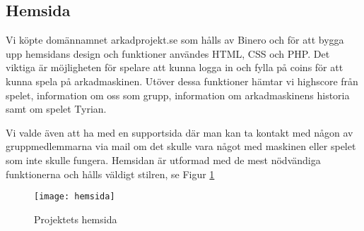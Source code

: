 \documentclass[12pt,fleqn,openany]{book} %
\begin{document}
\begin{table}[!h]
\centering\caption{Förklaring av databastabell}
\label{table_databas}
\end{table}

\subsection{Hemsida}

Vi köpte domännamnet arkadprojekt.se som hålls av Binero och för att bygga upp hemsidans design och funktioner användes HTML, CSS och PHP. 
Det viktiga är möjligheten för spelare att kunna logga in och fylla på coins för att kunna spela 
på arkadmaskinen. Utöver dessa funktioner hämtar vi highscore från spelet, information om oss som grupp, information om arkadmaskinens 
historia samt om spelet Tyrian.

Vi valde även att ha med en supportsida där man kan ta kontakt med någon av gruppmedlemmarna via mail om det 
skulle vara något med maskinen eller spelet som inte skulle fungera. Hemsidan är utformad med de mest nödvändiga funktionerna och hålls väldigt stilren, se Figur \ref{fig_hemsida}
\begin{figure}[h]
\centering\texttt{[image: hemsida]}
\caption{Projektets hemsida}
\label{fig_hemsida}
\end{figure}
\end{document}

